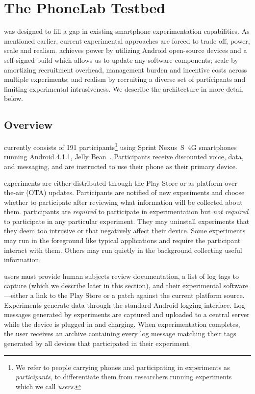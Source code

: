 \section{The PhoneLab Testbed}
\label{sec-testbed}

\PhoneLab{} was designed to fill a gap in existing smartphone experimentation
capabilities. As mentioned earlier, current experimental approaches are
forced to trade off, power, scale and realism. \PhoneLab{} achieves power by
utilizing Android open-source devices and a self-signed build which allows us
to update any software components; scale by amortizing recruitment overhead,
management burden and incentive costs across multiple experiments; and
realism by recruiting a diverse set of participants and limiting experimental
intrusiveness. We describe the architecture \PhoneLab{} in more detail below.

\subsection{Overview}

\PhoneLab{} currently consists of 191 participants\footnote{We refer to
people carrying \PhoneLab{} phones and participating in experiments as
\PhoneLab{} \textit{participants}, to differentiate them from researchers
running \PhoneLab{} experiments which we call \textit{users}.} using Sprint
Nexus~S~4G smartphones~\cite{nexuss4g} running Android 4.1.1, Jelly
Bean~\cite{jellybean}. Participants receive discounted voice, data, and
messaging, and are instructed to use their \PhoneLab{} phone as their primary
device.

\PhoneLab{} experiments are either distributed through the Play Store or as
platform over-the-air (OTA) updates. Participants are notified of new
experiments and choose whether to participate after reviewing what
information will be collected about them. \PhoneLab{} participants are
\textit{required} to participate in experimentation but \textit{not required}
to participate in any particular experiment. They may uninstall experiments
that they deem too intrusive or that negatively affect their device. Some
experiments may run in the foreground like typical applications and require
the participant interact with them. Others may run quietly in the background
collecting useful information. 

\PhoneLab{} users must provide human subjects review documentation, a list of
log tags to capture (which we describe later in this section), and their
experimental software---either a link to the Play Store or a patch against the
current \PhoneLab{} platform source.  Experiments generate data through the
standard Android logging interface. Log messages generated by \PhoneLab{}
experiments are captured and uploaded to a central server while the device is
plugged in and charging. When experimentation completes, the user receives an
archive containing every log message matching their tags generated by all
\PhoneLab{} devices that participated in their experiment.

